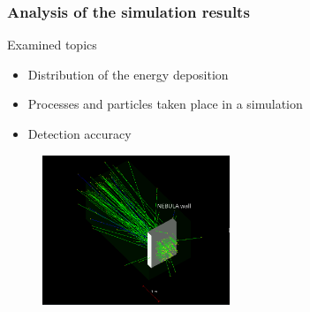 \begin{frame}
\frametitle{Analysis of the simulation results}

\begin{exampleblock}{Examined topics}
	\begin{itemize}
		\item Distribution of the energy deposition
		\item Processes and particles taken place in a simulation
		\item Detection accuracy
	\end{itemize}
\end{exampleblock}

\begin{figure}
	\includegraphics[width=0.5\textwidth]{images/nebula_3d.png}
\end{figure}


\end{frame}